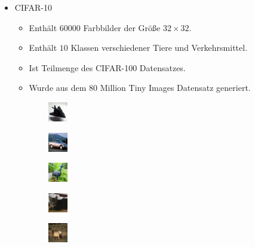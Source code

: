 \documentclass[aspectratio=169, 12pt]{beamer}
\begin{document}
\begin{frame}
  \begin{itemize}
    \item CIFAR-10
    \begin{itemize}
      \item Enthält $60000$ Farbbilder der Größe $32 \times 32$.
      \item Enthält $10$ Klassen verschiedener Tiere und Verkehrsmittel.
      \item Ist Teilmenge des CIFAR-100 Datensatzes.
      \item Wurde aus dem 80 Million Tiny Images Datensatz generiert.
    \end{itemize}
  \end{itemize}
  \begin{figure}
    \begin{subfigure}{1.4cm}
        \centering
        \includegraphics{images/datasets/cifar10/cifar_10_0_0.png}
    \end{subfigure}
    \begin{subfigure}{1.4cm}
        \centering
        \includegraphics{images/datasets/cifar10/cifar_10_1_0.png}
    \end{subfigure}
    \begin{subfigure}{1.4cm}
        \centering
        \includegraphics{images/datasets/cifar10/cifar_10_2_0.png}
    \end{subfigure}
    \begin{subfigure}{1.4cm}
        \centering
        \includegraphics{images/datasets/cifar10/cifar_10_3_0.png}
    \end{subfigure}
    \begin{subfigure}{1.4cm}
        \centering
        \includegraphics{images/datasets/cifar10/cifar_10_4_0.png}

\end{subfigure}
\end{figure}
\end{frame}
\end{document}
